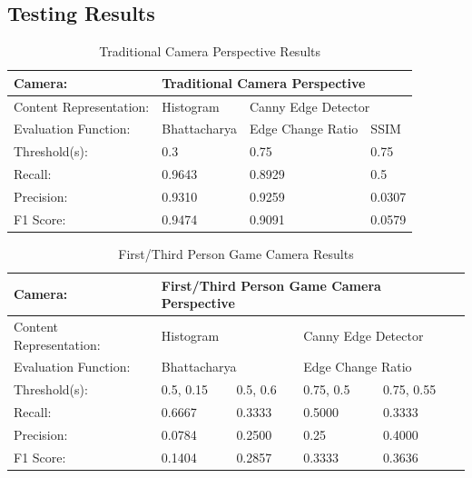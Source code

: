 \documentclass[12pt]{article}
\begin{document}
\subsection{Testing Results}
\begin{table}[h]
    \begin{tabular}{|l|l|l|l|}
    \hline
    Camera:                 & \multicolumn{3}{l|}{Traditional Camera Perspective}            \\ \hline
    Content Representation: & Histogram    & \multicolumn{2}{l|}{Canny Edge Detector}        \\ \hline
    Evaluation Function:    & Bhattacharya & Edge Change Ratio & SSIM \\ \hline
    Threshold(s):           & 0.3          & 0.75              & 0.75                        \\ \hline
    Recall:                 & 0.9643       & 0.8929            & 0.5                         \\ \hline
    Precision:              & 0.9310       & 0.9259            & 0.0307                      \\ \hline
    F1 Score:               & 0.9474       & 0.9091            & 0.0579                      \\ \hline
    \end{tabular}
    \caption{Traditional Camera Perspective Results}
    \label{Traditional Camera Perspective Results}
\end{table}
\begin{table}[h]
    \begin{tabular}{|l|l|l|l|l|}
    \hline
    Camera:                 & \multicolumn{4}{l|}{First/Third Person Game Camera Perspective}                   \\ \hline
    Content Representation: & \multicolumn{2}{l|}{Histogram}    & \multicolumn{2}{l|}{Canny Edge Detector} \\ \hline
    Evaluation Function:    & \multicolumn{2}{l|}{Bhattacharya} & \multicolumn{2}{l|}{Edge Change Ratio}   \\ \hline
    Threshold(s):           & 0.5, 0.15         & 0.5, 0.6      & 0.75, 0.5          & 0.75, 0.55          \\ \hline
    Recall:                 & 0.6667            & 0.3333        & 0.5000             & 0.3333              \\ \hline
    Precision:              & 0.0784            & 0.2500        & 0.25               & 0.4000              \\ \hline
    F1 Score:               & 0.1404            & 0.2857        & 0.3333             & 0.3636              \\ \hline
    \end{tabular}
    \caption{First/Third Person Game Camera Results}
    \label{First/Third Person Game Camera Results}
\end{table}
\end{document}
